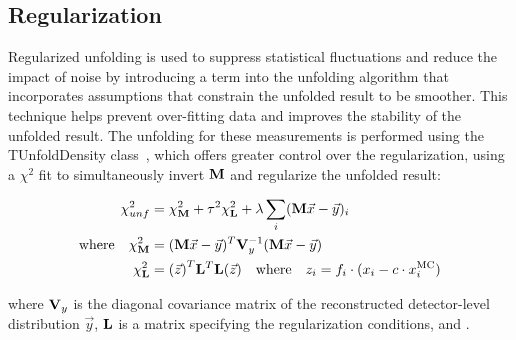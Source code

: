 \subsection{Regularization}
\label{Regularization}
Regularized unfolding is used to suppress statistical fluctuations and reduce the impact of noise by introducing a term into the unfolding algorithm that incorporates assumptions that constrain the unfolded result to be smoother.
This technique helps prevent over-fitting data and improves the stability of the unfolded result.
The unfolding for these measurements is performed using the TUnfoldDensity class~\cite{TUnfold}, which offers greater control over the regularization, using a $\chi^{2}$ fit to simultaneously invert $\mathbf{M}$ and regularize the unfolded result:
\begin{linenomath*}
\begin{align}
\chi^{2}_{unf}&=\chi^{2}_{\mathbf{M}}+\tau^{2}\chi^{2}_{\mathbf{L}}+\lambda\sum_{i}(\mathbf{M}\vec{x}-\vec{y})_{i} \\
\mathrm{where \quad} \chi^{2}_{\mathbf{M}}&=(\mathbf{M}\vec{x}-\vec{y})^{T}\mathbf{V}_{y}^{-1}(\mathbf{M}\vec{x}-\vec{y}) \\
\chi^{2}_{\mathbf{L}}&={(\vec{z})}^{T}\mathbf{L}^{T}\mathbf{L}{(\vec{z})} \quad \text{where} \quad z_i = f_i \cdot (x_i - c \cdot x^{\text{MC}}_i)
\label{eq:Chi2TUnfold}
\end{align}
\end{linenomath*}
where $\mathbf{V}_{y}$ is the diagonal covariance matrix of the reconstructed detector-level distribution $\vec{y}$, $\mathbf{L}$ is a matrix specifying the regularization conditions, and .

